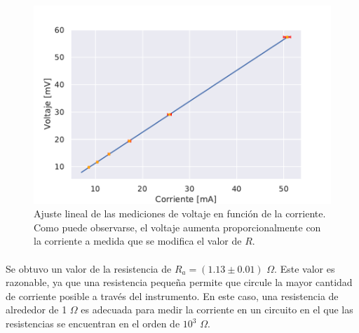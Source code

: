 \begin{figure}[H]
    \centering
    \includegraphics[width = 0.65\linewidth]{figuras/amperimetro.pdf}
    \caption{Ajuste lineal de las mediciones de voltaje en función de la corriente. Como puede observarse, el voltaje aumenta proporcionalmente con la corriente a medida que se modifica el valor de $R$.}
    \label{fig:fig_amperimetro}
\end{figure}

\paragraph{}
Se obtuvo un valor de la resistencia de $R_a=(1.13 \pm 0.01)$ $\Omega$. Este valor es razonable, ya que una resistencia pequeña permite que circule la mayor cantidad de corriente posible a través del instrumento. En este caso, una resistencia de alrededor de 1 $\Omega$ es adecuada para medir la corriente en un circuito en el que las resistencias se encuentran en el orden de $10^{3}$ $\Omega$.